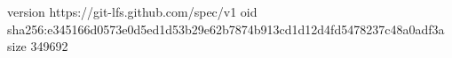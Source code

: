 version https://git-lfs.github.com/spec/v1
oid sha256:e345166d0573e0d5ed1d53b29e62b7874b913cd1d12d4fd5478237c48a0adf3a
size 349692
